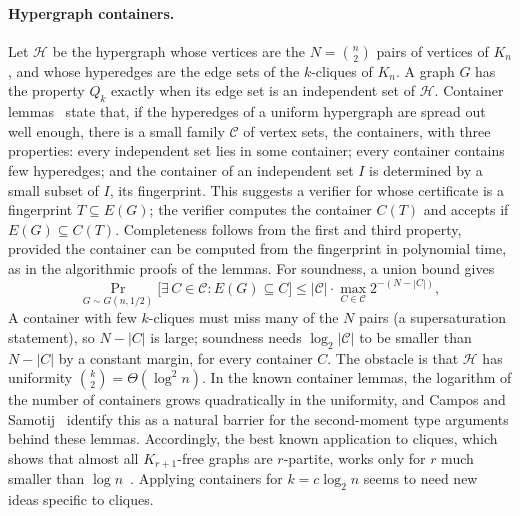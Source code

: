 \documentclass[11pt]{article}
\theoremstyle{remark}
\begin{document}
\paragraph{Hypergraph containers.} Let $\mathcal{H}$ be the hypergraph whose vertices are the $N = \binom{n}{2}$ pairs of vertices of $K_n$, and whose hyperedges are the edge sets of the $k$-cliques of $K_n$. A graph $G$ has the property $Q_k$ exactly when its edge set is an independent set of $\mathcal{H}$. Container lemmas~\cite{bms2015,saxton-thomason2015} state that, if the hyperedges of a uniform hypergraph are spread out well enough, there is a small family $\mathcal{C}$ of vertex sets, the containers, with three properties: every independent set lies in some container; every container contains few hyperedges; and the container of an independent set $I$ is determined by a small subset of $I$, its fingerprint. This suggests a verifier for  whose certificate is a fingerprint $T \subseteq E(G)$; the verifier computes the container $C(T)$ and accepts if $E(G) \subseteq C(T)$. Completeness follows from the first and third property, provided the container can be computed from the fingerprint in polynomial time, as in the algorithmic proofs of the lemmas. For soundness, a union bound gives
\[
    \Pr_{G \sim G(n, 1/2)}\big[\exists\, C \in \mathcal{C} : E(G) \subseteq C\big] \leq |\mathcal{C}| \cdot \max_{C \in \mathcal{C}} 2^{-(N - |C|)},
\]
A container with few $k$-cliques must miss many of the $N$ pairs (a supersaturation statement), so $N - |C|$ is large; soundness needs $\log_2 |\mathcal{C}|$ to be smaller than $N - |C|$ by a constant margin, for every container $C$. The obstacle is that $\mathcal{H}$ has uniformity $\binom{k}{2} = \Theta(\log^2 n)$. In the known container lemmas, the logarithm of the number of containers grows quadratically in the uniformity, and Campos and Samotij~\cite{campos-samotij} identify this as a natural barrier for the second-moment type arguments behind these lemmas. Accordingly, the best known application to cliques, which shows that almost all $K_{r+1}$-free graphs are $r$-partite, works only for $r$ much smaller than $\log n$~\cite{balogh-samotij2020}. Applying containers for $k = c \log_2 n$ seems to need new ideas specific to cliques.
\end{document}
